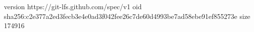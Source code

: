 version https://git-lfs.github.com/spec/v1
oid sha256:c2e377a2ed3fecb3e4e0ad3f042fee26c7de60d4993be7ad58ebe91ef855273e
size 174916
